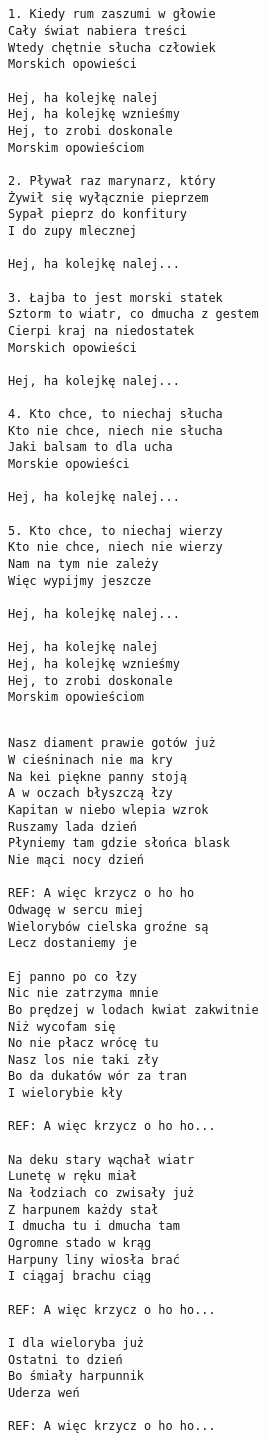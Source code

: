\documentclass[12pt]{article}
\begin{document}
\subsection*{}
\begin{verbatim}
1. Kiedy rum zaszumi w głowie
Cały świat nabiera treści
Wtedy chętnie słucha człowiek
Morskich opowieści

Hej, ha kolejkę nalej
Hej, ha kolejkę wznieśmy
Hej, to zrobi doskonale
Morskim opowieściom

2. Pływał raz marynarz, który
Żywił się wyłącznie pieprzem
Sypał pieprz do konfitury
I do zupy mlecznej

Hej, ha kolejkę nalej...

3. Łajba to jest morski statek
Sztorm to wiatr, co dmucha z gestem
Cierpi kraj na niedostatek
Morskich opowieści

Hej, ha kolejkę nalej...

4. Kto chce, to niechaj słucha
Kto nie chce, niech nie słucha
Jaki balsam to dla ucha
Morskie opowieści

Hej, ha kolejkę nalej...

5. Kto chce, to niechaj wierzy
Kto nie chce, niech nie wierzy
Nam na tym nie zależy
Więc wypijmy jeszcze

Hej, ha kolejkę nalej...

Hej, ha kolejkę nalej
Hej, ha kolejkę wznieśmy
Hej, to zrobi doskonale
Morskim opowieściom
\end{verbatim}
\clearpage

\subsection*{}
\begin{verbatim}
Nasz diament prawie gotów już
W cieśninach nie ma kry
Na kei piękne panny stoją
A w oczach błyszczą łzy
Kapitan w niebo wlepia wzrok
Ruszamy lada dzień
Płyniemy tam gdzie słońca blask
Nie mąci nocy dzień

REF: A więc krzycz o ho ho
Odwagę w sercu miej
Wielorybów cielska groźne są
Lecz dostaniemy je

Ej panno po co łzy
Nic nie zatrzyma mnie
Bo prędzej w lodach kwiat zakwitnie
Niż wycofam się
No nie płacz wrócę tu
Nasz los nie taki zły
Bo da dukatów wór za tran
I wielorybie kły

REF: A więc krzycz o ho ho...

Na deku stary wąchał wiatr
Lunetę w ręku miał
Na łodziach co zwisały już
Z harpunem każdy stał
I dmucha tu i dmucha tam
Ogromne stado w krąg
Harpuny liny wiosła brać
I ciągaj brachu ciąg

REF: A więc krzycz o ho ho...

I dla wieloryba już
Ostatni to dzień
Bo śmiały harpunnik
Uderza weń

REF: A więc krzycz o ho ho...
\end{verbatim}
\clearpage
\end{document}

